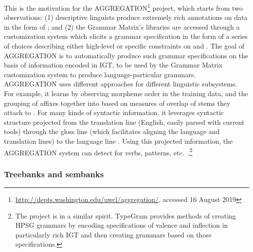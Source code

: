 \documentclass[output=paper,nonflat]{langsci/langscibook}
\begin{document}
This is the motivation for the AGGREGATION\footnote{\url{http://depts.washington.edu/uwcl/aggregation/}, accessed 16 August 2019}
project, which starts from two observations: (1) descriptive linguists
produce extremely rich annotations on data in the form of ; and (2) the Grammar Matrix's libraries are
accessed through a customization system which elicits a grammar
specification in the form of a series of choices describing either
high-level  or specific constraints on  and .  The goal of AGGREGATION is to
automatically produce such grammar specifications on the basis of
information encoded in IGT, to be used by the Grammar Matrix
customization system to produce language-particular
grammars. AGGREGATION uses different approaches for different
linguistic subsystems. For example, it learns  by
observing morpheme order in the training data, and the grouping
of affixes together into  based on measures of overlap of
stems they attach to \citep{Wax:14,Zamaraeva:17}. For many kinds of
syntactic information, it leverages syntactic structure projected from
the translation line (English, easily parsed with current tools)
through the gloss line (which facilitates aligning the language and
translation lines) to the language line
\citep{Xia:Lew:07,Georgi:16}. Using this projected information, the
AGGREGATION system can detect  for verbs, 
patterns, etc.\ \citep{Ben:Goo:Cro:Xia:13,Zam:How:Ben:19}.\footnote{The  project \citep{Hel:Bee:14} is in a similar spirit. TypeGram provides methods of creating HPSG grammars by encoding specifications of valence and inflection in particularly rich IGT and then creating grammars based on those specifications.}


\subsubsection{Treebanks and sembanks}
\label{cl:lang-doc:treebanks}

\end{document}
